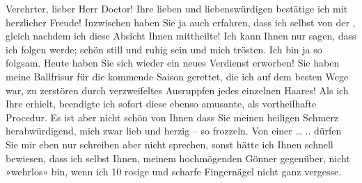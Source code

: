 \pstart{}Verehrter, lieber Herr Doctor!\pend\vspace{0.5em}
\pstart
           Ihre lieben und liebenswürdigen \label{K_L03715-1v}\label{K_L03715-1} bestätige
            ich \introOben{}mit\introOben{} herzlicher Freude!
          Inzwischen haben Sie ja auch erfahren, dass ich selbst von der \label{K_L03715-2v}\label{K_L03715-2}\label{K_L03715-3v}\label{K_L03715-3}, gleich nachdem ich diese Absicht Ihnen mittheilte! Ich kann Ihnen nur sagen,
          dass ich folgen werde; schön still und ruhig sein und mich trösten. Ich bin ja so folg{\pb}sam. Heute haben Sie sich wieder ein neues Verdienst erworben! Sie
          haben meine Ballfrisur für die kommende Saison gerettet, die ich auf dem besten Wege war,
          zu zerstören durch verzweifeltes Ausruppfen jedes einzelnen Haares! Als ich Ihre \label{K_L03715-4v}\label{K_L03715-4} erhielt, beendigte ich sofort diese ebenso
          amusante, als vortheilhafte Procedur. Es ist aber nicht schön von Ihnen dass Sie meinen
          heiligen Schmerz herabwürdigend, mich zwar lieb und herzig – so frozzeln. Von einer …
            \label{K_L03715-5v}\label{K_L03715-5} .. dürfen Sie mir
          eben nur schreiben aber nicht spre{\pb}chen, sonst hätte ich Ihnen schnell
          bewiesen, dass ich selbst Ihnen, meinem hochmögenden Gönner gegenüber, nicht »wehrlos«
          bin, wenn ich 10 rosige und scharfe Fingernägel nicht ganz vergesse.\pend
           
